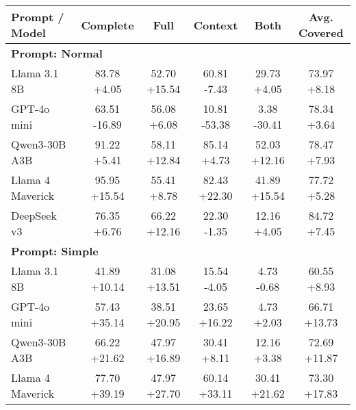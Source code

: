\documentclass{article}%
\begin{document}
%
\normalsize%


\begin{table}[h!]%
\centering%
\small%
\begin{tabular}{@{}l c c c c c@{}}%
\toprule%
\textbf{Prompt / Model}&\textbf{Complete}&\textbf{Full}&\textbf{Context}&\textbf{Both}&\textbf{Avg. Covered}\\%
\midrule%
\multicolumn{6}{l}{\textbf{Prompt: Normal}} \\%
Llama 3.1 8B&83.78 \textcolor{own_green}{+4.05}&52.70 \textcolor{own_green}{+15.54}&60.81 \textcolor{own_red}{-7.43}&29.73 \textcolor{own_green}{+4.05}&73.97 \textcolor{own_green}{+8.18}\\%
GPT{-}4o mini&63.51 \textcolor{own_red}{-16.89}&56.08 \textcolor{own_green}{+6.08}&10.81 \textcolor{own_red}{-53.38}&3.38 \textcolor{own_red}{-30.41}&78.34 \textcolor{own_green}{+3.64}\\%
Qwen3{-}30B A3B&91.22 \textcolor{own_green}{+5.41}&58.11 \textcolor{own_green}{+12.84}&85.14 \textcolor{own_green}{+4.73}&52.03 \textcolor{own_green}{+12.16}&78.47 \textcolor{own_green}{+7.93}\\%
Llama 4 Maverick&95.95 \textcolor{own_green}{+15.54}&55.41 \textcolor{own_green}{+8.78}&82.43 \textcolor{own_green}{+22.30}&41.89 \textcolor{own_green}{+15.54}&77.72 \textcolor{own_green}{+5.28}\\%
DeepSeek v3&76.35 \textcolor{own_green}{+6.76}&66.22 \textcolor{own_green}{+12.16}&22.30 \textcolor{own_red}{-1.35}&12.16 \textcolor{own_green}{+4.05}&84.72 \textcolor{own_green}{+7.45}\\%
\midrule%
\multicolumn{6}{l}{\textbf{Prompt: Simple}} \\%
Llama 3.1 8B&41.89 \textcolor{own_green}{+10.14}&31.08 \textcolor{own_green}{+13.51}&15.54 \textcolor{own_red}{-4.05}&4.73 \textcolor{own_red}{-0.68}&60.55 \textcolor{own_green}{+8.93}\\%
GPT{-}4o mini&57.43 \textcolor{own_green}{+35.14}&38.51 \textcolor{own_green}{+20.95}&23.65 \textcolor{own_green}{+16.22}&4.73 \textcolor{own_green}{+2.03}&66.71 \textcolor{own_green}{+13.73}\\%
Qwen3{-}30B A3B&66.22 \textcolor{own_green}{+21.62}&47.97 \textcolor{own_green}{+16.89}&30.41 \textcolor{own_green}{+8.11}&12.16 \textcolor{own_green}{+3.38}&72.69 \textcolor{own_green}{+11.87}\\%
Llama 4 Maverick&77.70 \textcolor{own_green}{+39.19}&47.97 \textcolor{own_green}{+27.70}&60.14 \textcolor{own_green}{+33.11}&30.41 \textcolor{own_green}{+21.62}&73.30 \textcolor{own_green}{+17.83}\\%

\end{tabular}
\end{table}
\end{document}
